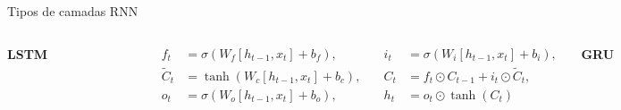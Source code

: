 \documentclass{beamer}
\begin{document}
\begin{frame}{Tipos de camadas RNN}
	\begin{columns}[t]
		\vspace{-5mm}
		\begin{center}
			\textbf{LSTM}
		\end{center}
		\vspace{-5mm}
		\begin{figure}[h]
			\centering
			\includegraphics[width=0.5\textwidth]{assets/LSTM_Gates.png}
		\end{figure}
		\vspace{-2mm}
		\tiny
		\[
		\begin{alignedat}{2}
			f_t & = \sigma(W_f [h_{t-1}, x_t] + b_f), \quad & 
			i_t & = \sigma(W_i [h_{t-1}, x_t] + b_i), \\
			\tilde{C}_t & = \tanh(W_c [h_{t-1}, x_t] + b_c), \quad &
			C_t & = f_t \odot C_{t-1} + i_t \odot \tilde{C}_t, \\
			o_t & = \sigma(W_o [h_{t-1}, x_t] + b_o), \quad &
			h_t & = o_t \odot \tanh(C_t)
		\end{alignedat}
		\]
		\vspace{-5mm}
		\begin{center}
			\textbf{GRU}
		\end{center}
		\vspace{-5mm}
		\begin{figure}[h]
			\centering
			\includegraphics[width=0.5\textwidth]{assets/colah-GRU-layer.png}
		\end{figure}
		\vspace{-2mm}
		\tiny\[
			\begin{aligned}
				z_t         & = \sigma(W_z \cdot [h_{t-1}, x_t ])               \\
				r_t         & = \sigma(W_r \cdot [h_{t-1}, x_t ])               \\
				\tilde{h}_t & = \tanh(W \cdot [r_t \odot h_{t-1}, x_t ])        \\
				h_t         & = (1 - z_t) \odot h_{t-1} + z_t \odot \tilde{h}_t
			\end{aligned}
		\]

	\end{columns}
\end{frame}
\end{document}
